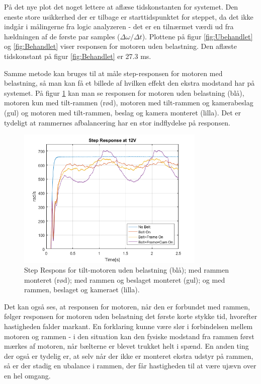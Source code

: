 På det nye plot det noget lettere at aflæse tidskonstanten for systemet. Den eneste store usikkerhed der er tilbage er starttidspunktet for steppet, da det ikke indgår i målingerne fra logic analyzeren - det er en tilnærmet værdi ud fra hældningen af de første par samples ($\Delta\omega/\Delta t$). Plottene på figur \ref{fig:Ubehandlet} og \ref{fig:Behandlet} viser responsen for motoren uden belastning. Den aflæste tidskonstant på figur \ref{fig:Behandlet} er 27.3 ms.

Samme metode kan bruges til at måle step-responsen for motoren med belastning, så man kan få et billede af hvilken effekt den ekstra modstand har på systemet. På figur \ref{fig:Combined} kan man se responsen for motoren uden belastning (blå), motoren kun med tilt-rammen (rød), motoren med tilt-rammen og kamerabeslag (gul) og motoren med tilt-rammen, beslag og kamera monteret (lilla). Det er tydeligt at rammernes afbalancering har en stor indflydelse på responsen.

\begin{figure}[!ht]
	\begin{center}
		\includegraphics[width=0.8\textwidth]{Billeder/Response_Combined.png}
	\end{center}
	\caption{Step Respons for tilt-motoren uden belastning (blå); med rammen monteret (rød); med rammen og beslaget monteret (gul); og med rammen, beslaget og kameraet (lilla).}
	\label{fig:Combined}
\end{figure}

Det kan også ses, at responsen for motoren, når den er forbundet med rammen, følger responsen for motoren uden belastning det første korte stykke tid, hvorefter hastigheden falder markant. En forklaring kunne være slør i forbindelsen mellem motoren og rammen - i den situation kan den fysiske modstand fra rammen først mærkes af motoren, når bælterne er blevet trukket helt i spænd. En anden ting der også er tydelig er, at selv når der ikke er monteret ekstra udstyr på rammen, så er der stadig en ubalance i rammen, der får hastigheden til at være ujævn over en hel omgang.

